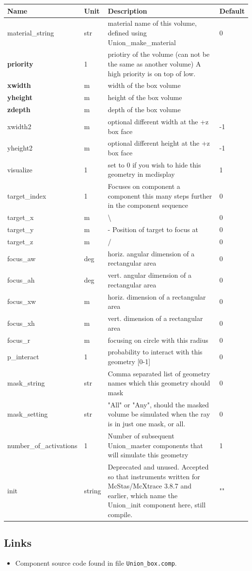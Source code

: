 \begin{longtable}{p{}p{}p{}p{}}
\toprule
\textbf{Name} & \textbf{Unit} & \textbf{Description} & \textbf{Default} \\
\midrule
\endhead
material\_string & str & material name of this volume, defined using Union\_make\_material & 0 \\
\textbf{priority} & 1 & priotiry of the volume (can not be the same as another volume) A high priority is on top of low. &  \\
\textbf{xwidth} & m & width of the box volume &  \\
\textbf{yheight} & m & height of the box volume &  \\
\textbf{zdepth} & m & depth of the box volume &  \\
xwidth2 & m & optional different width at the +z box face & -1 \\
yheight2 & m & optional different height at the +z box face & -1 \\
visualize & 1 & set to 0 if you wish to hide this geometry in mcdisplay & 1 \\
target\_index & 1 & Focuses on component a component this many steps further in the component sequence & 0 \\
target\_x & m & \textbackslash{} & 0 \\
target\_y & m & - Position of target to focus at & 0 \\
target\_z & m & / & 0 \\
focus\_aw & deg & horiz. angular dimension of a rectangular area & 0 \\
focus\_ah & deg & vert. angular dimension of a rectangular area & 0 \\
focus\_xw & m & horiz. dimension of a rectangular area & 0 \\
focus\_xh & m & vert. dimension of a rectangular area & 0 \\
focus\_r & m & focusing on circle with this radius & 0 \\
p\_interact & 1 & probability to interact with this geometry [0-1] & 0 \\
mask\_string & str & Comma separated list of geometry names which this geometry should mask & 0 \\
mask\_setting & str & "All" or "Any", should the masked volume be simulated when the ray is in just one mask, or all. & 0 \\
number\_of\_activations & 1 & Number of subsequent Union\_master components that will simulate this geometry & 1 \\
init & string & Deprecated and unused. Accepted so that instruments written for McStas/McXtrace 3.8.7 and earlier, which name the Union\_init component here, still compile. & "" \\
\bottomrule
\end{longtable}

\subsection*{Links}
\begin{itemize}
  \item Component source code found in file \texttt{Union\_box.comp}.
\end{itemize}
